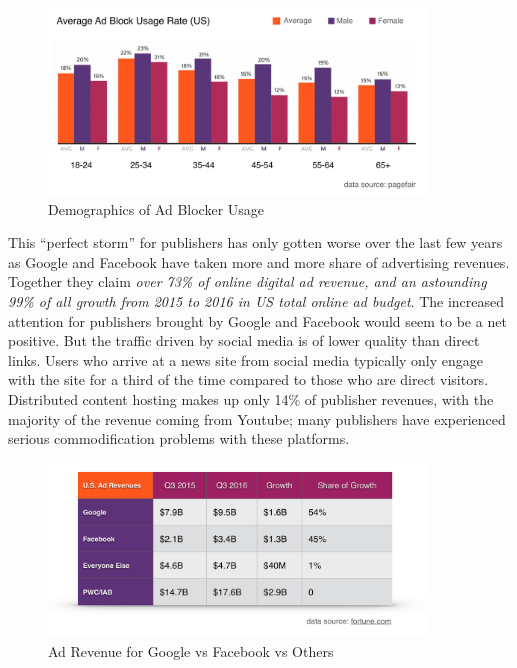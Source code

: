 \documentclass[11pt]{article}
\begin{document}
\begin{figure}
\begin{center}
\includegraphics[width=0.9\textwidth]{adblock_usage_demographics.png}
\caption{Demographics of Ad Blocker Usage}
\end{center}
\end{figure}



This “perfect storm” for publishers has only gotten worse over the last few years as Google and Facebook have taken more and more share of advertising revenues. Together they claim \textit{over 73\% of online digital ad revenue, and an astounding 99\% of all growth from 2015 to 2016 in US total online ad budget}\cite{12}.
The increased attention for publishers brought by Google and Facebook would seem to be a net positive. But the traffic driven by social media is of lower quality than direct links. Users who arrive at a news site from social media typically only engage with the site for a third\cite{SocMed} of the time compared to those who are direct visitors. Distributed content hosting makes up only 14\% of publisher revenues, with the majority of the revenue coming from Youtube\cite{DCN}; many publishers have experienced serious commodification problems with these platforms.


\begin{figure}
\begin{center}
\includegraphics[width=0.9\textwidth]{google_FB_everyone.png}
\caption{Ad Revenue for Google vs Facebook vs Others}
\end{center}
\end{figure}
\end{document}
